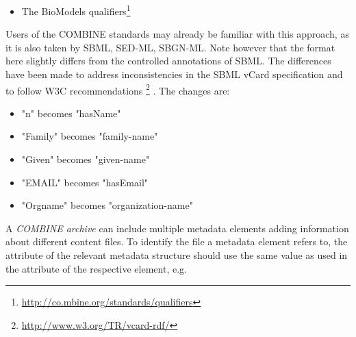 \begin{itemize}
{	Metadata terms\footnote{\url{http://dublincore.org/documents/dcmi-terms/}} of 
	the Dublin Core Metadata Initiative, in particular the terms: 

	\begin{itemize}
		\item {} (\url{http://purl.org/dc/terms/description}),
		\item {} (\url{http://purl.org/dc/terms/creator}), 
		\item {} (\url{http://purl.org/dc/terms/created}), 
		\item {} (\url{http://purl.org/dc/terms/modified}),
		\item {} (\url{http://purl.org/dc/terms/W3CDTF}).
	\end{itemize}
		
	More information on the use of Dublin Core in RDF can be found 
	on the Dublin Core website{\footnote{\url{http://dublincore.org/documents/dc-rdf/}}}. 
	
	More informationabout the definition of the date format used within  and 
	 elements is available on the W3C website {\footnote{\url{http://www.w3.org/TR/NOTE-datetime}}}.
	}
\item {The BioModels qualifiers\footnote{\url{http://co.mbine.org/standards/qualifiers}}
}
\end{itemize}

Users of the COMBINE standards may already be familiar with this 
approach, as it is also taken by SBML, SED-ML, SBGN-ML. 
Note however that the format here slightly differs from the controlled 
annotations of SBML. The differences have been made to address inconsistencies 
in the SBML vCard specification and to follow W3C recommendations {\footnote{\url{http://www.w3.org/TR/vcard-rdf/}}} . The changes are: 

\begin{itemize}
	\item  "n" becomes "hasName" 
	\item  "Family" becomes "family-name" 
	\item  "Given" becomes "given-name" 
	\item  "EMAIL" becomes "hasEmail" 
	\item  "Orgname" becomes "organization-name" 
\end{itemize}

A \textit{COMBINE archive} can include multiple metadata elements adding information about different content files. To 
identify the file a metadata element refers to, the  attribute of the relevant metadata structure should use the same value as used in the  attribute of the respective \Content element, e.g.

